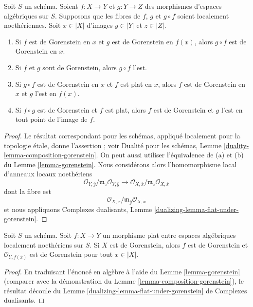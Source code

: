 \begin{lemma}
\label{lemma-composition-gorenstein}
Soit $S$ un schéma.
Soient $f : X \to Y$ et $g : Y \to Z$ des morphismes d'espaces algébriques
sur $S$. Supposons que les
fibres de $f$, $g$ et $g \circ f$ soient localement noethériennes.
Soit $x \in |X|$ d'images $y \in |Y|$ et $z \in |Z|$.
\begin{enumerate}
\item Si $f$ est de Gorenstein en $x$ et $g$ est de Gorenstein
en $f(x)$, alors $g \circ f$ est de Gorenstein en $x$.
\item Si $f$ et $g$ sont de Gorenstein, alors $g \circ f$ l'est.
\item Si $g \circ f$ est de Gorenstein en $x$ et $f$ est plat en $x$,
alors $f$ est de Gorenstein en $x$ et $g$ l'est en $f(x)$.
\item Si $f \circ g$ est de Gorenstein et $f$ est plat, alors
$f$ est de Gorenstein et $g$ l'est en tout point de
l'image de $f$.
\end{enumerate}
\end{lemma}

\begin{proof}
Le résultat correspondant pour les schémas, appliqué localement pour la
topologie étale, donne l'assertion ; voir Dualité pour les schémas, Lemme
\ref{duality-lemma-composition-gorenstein}.
On peut aussi utiliser l'équivalence de (a) et (b) du
Lemme \ref{lemma-gorenstein}. Nous considérons alors l'homomorphisme local
d'anneaux locaux noethériens
$$
\mathcal{O}_{Y, \overline{y}}/
\mathfrak m_{\overline{z}}\mathcal{O}_{Y, \overline{y}}
\longrightarrow
\mathcal{O}_{X, \overline{x}}/
\mathfrak m_{\overline{z}}\mathcal{O}_{X, \overline{x}}
$$
dont la fibre est
$$
\mathcal{O}_{X, \overline{x}}/
\mathfrak m_{\overline{y}}\mathcal{O}_{X, \overline{x}}
$$
et nous appliquons Complexes dualisants, Lemme
\ref{dualizing-lemma-flat-under-gorenstein}.
\end{proof}

\begin{lemma}
\label{lemma-flat-morphism-from-gorenstein}
Soit $S$ un schéma.
Soit $f : X \to Y$ un morphisme plat entre espaces algébriques localement noethériens
sur $S$.
Si $X$ est de Gorenstein, alors $f$ est de Gorenstein et
$\mathcal{O}_{Y, f(\overline{x})}$ est de Gorenstein pour tout $x \in |X|$.
\end{lemma}

\begin{proof}
En traduisant l'énoncé en algèbre à l'aide du Lemme \ref{lemma-gorenstein}
(comparer avec la démonstration du
Lemme \ref{lemma-composition-gorenstein}), le résultat découle du
Lemme \ref{dualizing-lemma-flat-under-gorenstein} de Complexes dualisants.
\end{proof}

